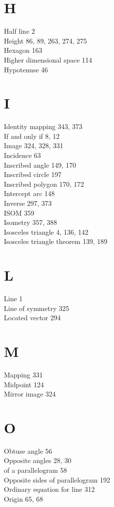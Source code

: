 \documentclass[12pt]{book} %
\begin{document}
\begin{ExerciseList}
\begin{ExerciseList}
\begin{ExerciseList}
\section*{H}
Half line 2\\
Height 86, 89, 263, 274, 275\\
Hexagon 163\\
Higher dimensional space 114\\
Hypotenuse 46

\section*{I}
Identity mapping 343, 373\\
If and only if 8, 12\\
Image 324, 328, 331\\
Incidence 63\\
Inscribed angle 149, 170\\
Inscribed circle 197\\
Inscribed polygon 170, 172\\
Intercept arc 148\\
Inverse 297, 373\\
ISOM 359\\
Isometry 357, 388\\
Isosceles triangle 4, 136, 142\\
Isosceles triangle theorem 139, 189

\section*{L}
Line 1\\
Line of symmetry 325\\
Located vector 294

\section*{M}
Mapping 331\\
Midpoint 124\\
Mirror image 324\\

\section*{O}
Obtuse angle 56\\
Opposite angles 28, 30\\
\hspace*{1em}of a parallelogram 58\\
Opposite sides of parallelogram 192\\
Ordinary equation for line 312\\
Origin 65, 68\\


\end{ExerciseList}
\end{ExerciseList}
\end{ExerciseList}
\end{document}
